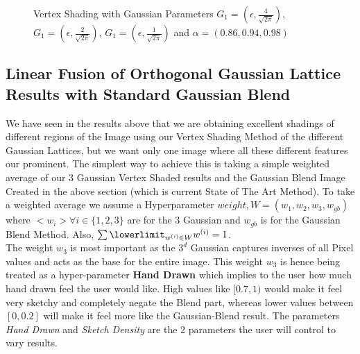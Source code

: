 \documentclass{article}
\begin{document}
\begin{figure}[ht]
    \centering
    \qquad
    \qquad
    \qquad
    \caption{\centering Vertex Shading with Gaussian Parameters $G_1=(\epsilon, \frac{4}{\sqrt{2 \pi}})$, $G_1=(\epsilon, \frac{2}{\sqrt{2 \pi}})$, $G_1=(\epsilon, \frac{1}{\sqrt{2 \pi}})$ and $\alpha=(0.86, 0.94, 0.98)$ \label{fig:lenna-vertex-shading-(4, 2, 1)-(0.86, 0.9, 0.94)}}
\end{figure}

\clearpage
\subsection{Linear Fusion of Orthogonal Gaussian Lattice Results with Standard Gaussian Blend}
We have seen in the results above that we are obtaining excellent shadings of different regions of the Image using our Vertex Shading Method of the different Gaussian Lattices, but we want only one image where all these different features our prominent. The simplest way to achieve this is taking a simple weighted average of our 3 Gaussian Vertex Shaded results and the Gaussian Blend Image Created in the above section (which is current State of The Art Method). To take a weighted average we assume a Hyperparameter $weight, W = (w_1, w_2, w_3, w_{gb})$ where $<w_i> \forall i \in \{1, 2, 3\}$ are for the 3 Gaussian and $w_{gb}$ is for the Gaussian Blend Method. Also, $\sum \lowerlimit_{w^{(i)} \in W} w^{(i)} = 1$. \\

The weight $w_3$ is most important as the $3^d$ Gaussian captures inverses of all Pixel values and acts as the base for the entire image. This weight $w_3$ is hence being treated as a hyper-parameter \textbf{Hand Drawn} which implies to the user how much hand drawn feel the user would like. High values like $[0.7, 1)$ would make it feel very sketchy and completely negate the Blend part, whereas lower values between $[0, 0.2]$ will make it feel more like the Gaussian-Blend result. The parameters \textit{Hand Drawn} and \textit{Sketch Density} are the 2 parameters the user will control to vary results.
 
\end{document}
